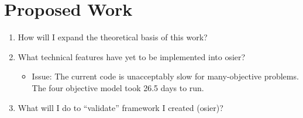 \chapter{Proposed Work}


\begin{enumerate}
    \item How will I expand the theoretical basis of this work?
    \item What technical features have yet to be implemented into \ac{osier}?
    \begin{itemize}
        \item Issue: The current code is unacceptably slow for many-objective
        problems. The four objective model took 26.5 days to run.
    \end{itemize}
    \item What will I do to ``validate'' framework I created (\ac{osier})?
\end{enumerate}